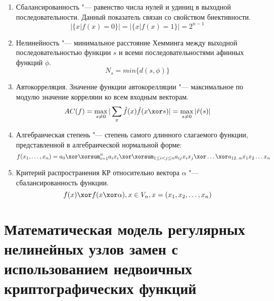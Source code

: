 \begin{enumerate}

    \item Сбалансированность "--- равенство числа нулей и удиниц в выходной последовательности.
    Данный показатель связан со свойством биективности.
    \begin{equation}|\{x | f(x) = 0\}| = |\{x | f(x) = 1\}| = 2^{n - 1}\end{equation}
    
    \item Нелинейность "--- минимальное расстояние Хемминга между выходной последовательностью
    функции $s$ и всеми последовательностями афинных функций $\phi$.
    \begin{equation}N_s=min\{d(s,\phi)\}\end{equation}

    \item Автокорреляция. Значение функции автокорелляции "--- максимальное по модулю значение
    корреляии ко всем входным векторам.
    \begin{equation}AC(f) = \max_{s \neq 0}|\sum_{x}\hat{f}(x)\hat{f}(x \xor s)| = \max_{s \neq 0}|\hat{r}(s)|\end{equation}

    \item Алгебраическая степень "--- степень самого длинного слагаемого функции, представленной
    в алгебраической нормальной форме:
    \begin{equation}f(x_1, \ldots ,x_n) = a_0 \xor \xorsum_{i=1}^{n}a_ix_i \xor \xorsum_{1 \leq i < j \leq n}a_{ij}x_ix_j \xor \ldots \xor a_{12..n}x_1x_2 \ldots x_n\end{equation}

    \item Критерий распространения КР относительно вектора $\alpha$ "--- сбалансированность функции.
    \begin{equation}f(x) \xor f(x \xor \alpha), x \in V_n, x = (x_1, x_2, \ldots , x_n)\end{equation}

\end{enumerate}

\section{Математическая модель регулярных нелинейных узлов замен с
использованием недвоичных криптографических функций}


